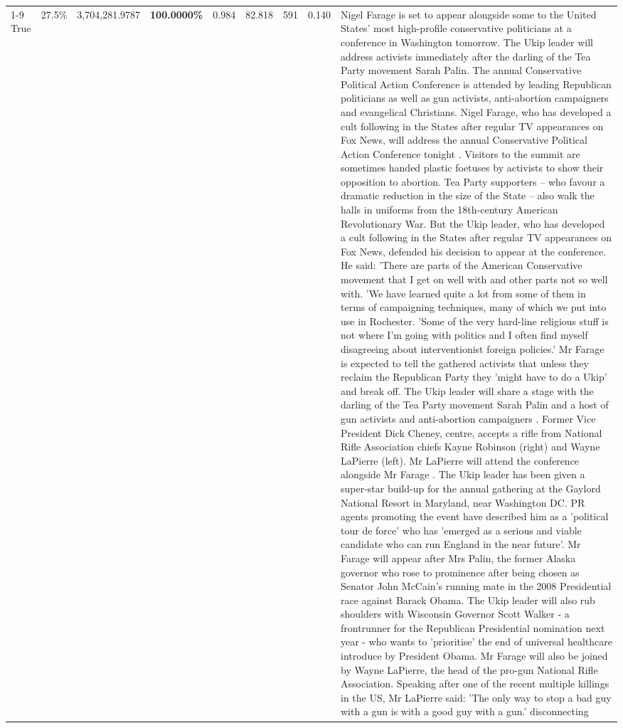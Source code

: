 \begin{table}[H]
\begin{tabular}{lllrlllll}
\cline{1-9} \cline{2-9}
True & 27.5\% & 3,704,281.9787 & \bfseries \color{red} 100.0000\% & 0.984 & 82.818 & 591 & 0.140 & Nigel Farage is set to appear alongside some to the United States' most high-profile conservative politicians at a conference in Washington tomorrow. The Ukip leader will address activists immediately after the darling of the Tea Party movement Sarah Palin. The annual Conservative Political Action Conference is attended by leading Republican politicians as well as gun activists, anti-abortion campaigners and evangelical Christians. Nigel Farage, who has developed a cult following in the States after regular TV appearances on Fox News, will address the annual Conservative Political Action Conference tonight . Visitors to the summit are sometimes handed plastic foetuses by activists to show their opposition to abortion. Tea Party supporters – who favour a dramatic reduction in the size of the State – also walk the halls in uniforms from the 18th-century American Revolutionary War. But the Ukip leader, who has developed a cult following in the States after regular TV appearances on Fox News, defended his decision to appear at the conference. He said: 'There are parts of the American Conservative movement that I get on well with and other parts not so well with. 'We have learned quite a lot from some of them in terms of campaigning techniques, many of which we put into use in Rochester. 'Some of the very hard-line religious stuff is not where I'm going with politics and I often find myself disagreeing about interventionist foreign policies.' Mr Farage is expected to tell the gathered activists that unless they reclaim the Republican Party they 'might have to do a Ukip' and break off. The Ukip leader will share a stage with the darling of the Tea Party movement Sarah Palin and a host of gun activists and anti-abortion campaigners . Former Vice President Dick Cheney, centre, accepts a rifle from National Rifle Association chiefs Kayne Robinson (right) and Wayne LaPierre (left). Mr LaPierre will attend the conference alongside Mr Farage . The Ukip leader has been given a super-star build-up for the annual gathering at the Gaylord National Resort in Maryland, near Washington DC. PR agents promoting the event have described him as a 'political tour de force' who has 'emerged as a serious and viable candidate who can run England in the near future'. Mr Farage will appear after Mrs Palin, the former Alaska governor who rose to prominence after being chosen as Senator John McCain's running mate in the 2008 Presidential race against Barack Obama. The Ukip leader will also rub shoulders with Wisconsin Governor Scott Walker - a frontrunner for the Republican Presidential nomination next year - who wants to 'prioritise' the end of universal healthcare introduce by President Obama. Mr Farage will also be joined by Wayne LaPierre, the head of the pro-gun National Rifle Association. Speaking after one of the recent multiple killings in the US, Mr LaPierre said: 'The only way to stop a bad guy with a gun is with a good guy with a gun.' disconnecting \\

\end{tabular}
\end{table}
